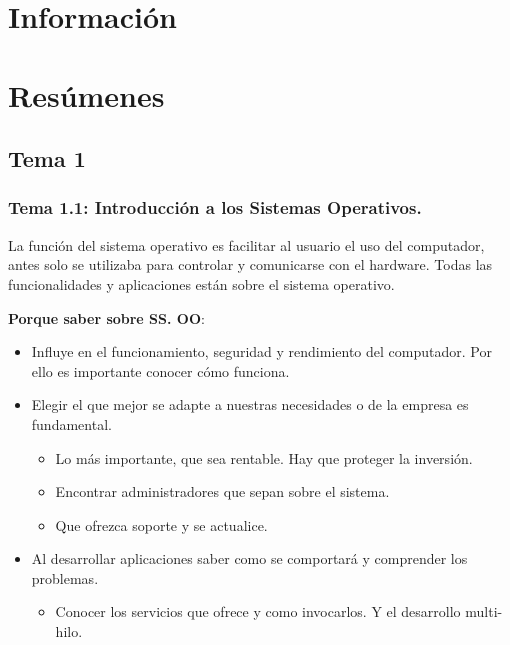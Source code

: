 \documentclass[12pt, twoside, openright]{report} %
\begin{document}




\part{Información}




\part{Resúmenes}
\chapter{Tema 1}
\section{Tema 1.1: Introducción a los Sistemas Operativos.}


  
  La función del sistema operativo es facilitar al usuario el uso del
  computador, antes solo se utilizaba para controlar y comunicarse con
  el hardware. Todas las funcionalidades y aplicaciones están sobre el
  sistema operativo.
  
  
  \textbf{Porque saber sobre SS. OO}:
  

  \begin{itemize}
  \item Influye en el funcionamiento, seguridad y rendimiento del
    computador. Por ello es importante conocer cómo funciona.
    
  \item Elegir el que mejor se adapte a nuestras necesidades o de la empresa
    es fundamental.
    

    \begin{itemize}
    \item Lo más importante, que sea rentable. Hay que proteger la
      inversión.
      
    \item Encontrar administradores que sepan sobre el sistema.
      
    \item Que ofrezca soporte y se actualice.
      
    \end{itemize}
  \item Al desarrollar aplicaciones saber como se comportará y comprender
    los problemas.
    

    \begin{itemize}
    \item Conocer los servicios que ofrece y como invocarlos. Y el
      desarrollo multi-hilo.
      
    \end{itemize}
  \end{itemize}
  
\end{document}
